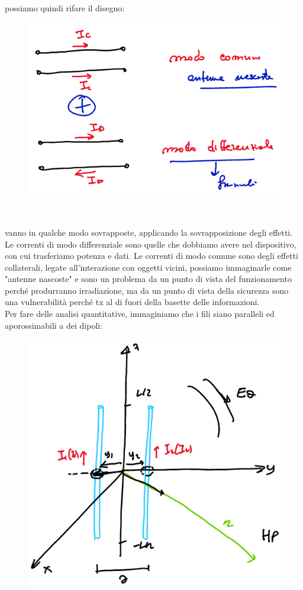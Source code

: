 \documentclass[oneside, 12pt]{extbook}
\begin{document}
possiamo quindi rifare il disegno:\\
\begin{figure}[!h]
	\includegraphics[scale=0.3]{immagini/correnti_d.png}
\end{figure}
\\\\vanno in qualche modo sovrapposte, applicando la sovrapposizione degli effetti.\\Le correnti di modo differenziale sono quelle che dobbiamo avere nel dispositivo, con cui trasferiamo potenza e dati. Le correnti di modo comune sono degli effetti collaterali, legate all'interazione con oggetti vicini, possiamo immaginarle come "antenne nascoste" e sono un problema da un punto di vista del funzionamento perché produrranno irradiazione, ma da un punto di vista della sicurezza sono una vulnerabilità perché tx al di fuori della basette delle informazioni.\\Per fare delle analisi quantitative, immaginiamo che i fili siano paralleli ed aporossimabili a dei dipoli:\\
\begin{figure}[!h]
	\includegraphics[scale=0.3]{immagini/rapp_array.png}
\end{figure}
\end{document}
